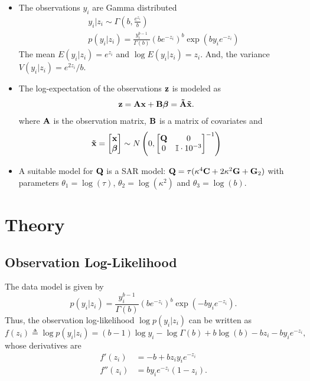 \documentclass[a4paper,10pt]{article}
\def\bA{{\bf A}}
\def\bB{{\bf B}}
\def\bG{{\bf G}}
\def\bQ{{\bf Q}}
\def\bC{{\bf C}}
\def\btA{{\bf \tilde A}}
\def\bx{{\bf x}}
\def\bz{{\bf z}}
\def\btx{{\bf{\tilde x}}}
\def\bbeta{{\boldsymbol \beta}}
\begin{document}
\begin{itemize}
 \item The observations $y_i$ are Gamma distributed
 \begin{align*}
  & y_i|z_i \sim \Gamma \left( b , \frac{e^{z_i}}{b}\right) \\
  & p(y_i|z_i) = \frac{y_i^{b-1}}{\Gamma(b)} \left( b e^{-z_i} \right)^b \exp(b y_i e^{-z_i})
 \end{align*}
 The mean $E(y_i|z_i) = e^{z_i}$ and $\log E(y_i|z_i) = z_i$. And, the variance $V(y_i|z_i) = e^{2z_i}/b$.
 
 \item The log-expectation of the observations $\bz$ is modeled as 
 \begin{align*}
  & \bz = \bA \bx + \bB \bbeta = \btA \btx.
 \end{align*}
 where $\bA$ is the observation matrix, $\bB$ is a matrix of covariates and
 \begin{align*}
  &\btx = \begin{bmatrix}
          \bx \\
          \bbeta
         \end{bmatrix} \sim
         N\left( 0, \begin{bmatrix}
                     \bQ & 0 \\
                     0 & \mathbb{I} \cdot 10^{-3}
                    \end{bmatrix}^{-1}
 \right)
 \end{align*}
 \item A suitable model for $\bQ$ is a SAR model: $\bQ = \tau (\kappa^4 \bC + 2\kappa^2 \bG + \bG_2)$ with parameters $\theta_1 = \log (\tau)$,  $\theta_2 = \log (\kappa^2)$  and $\theta_3 = \log(b)$.
\end{itemize}


\section{Theory}
\subsection{Observation Log-Likelihood}
The data model is given by
\begin{equation}
 p(y_i|z_i) = \frac{y_i^{b-1}}{\Gamma(b)} (be^{-z_i})^b \exp (-by_ie^{-z_i}).
 \label{eq:datamodel}
\end{equation}
Thus, the observation log-likelihood $\log p(y_i|z_i)$ can be written as
\begin{equation*}
 f(z_i) \triangleq \log p(y_i|z_i) = (b-1) \log y_i - \log \Gamma(b) + b \log (b) - b z_i - b y_i e^{-z_i},
\end{equation*}
whose derivatives are
\begin{align*}
 f'(z_i) &= -b + b z_i y_i e^{-z_i} \\
 f''(z_i) &= b y_i e^{-z_i} (1 - z_i) .
\end{align*}
\end{document}
